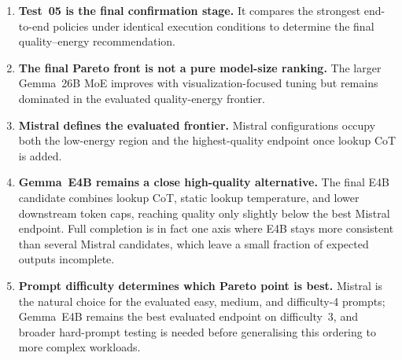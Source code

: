 \begin{enumerate}
    \item \textbf{Test~05 is the final confirmation stage.}
          It compares the strongest end-to-end policies under identical
          execution conditions to determine the final quality--energy
          recommendation.

    \item \textbf{The final Pareto front is not a pure model-size ranking.}
          The larger Gemma~26B MoE improves with visualization-focused tuning
          but remains dominated in the evaluated quality-energy frontier.

    \item \textbf{Mistral defines the evaluated frontier.}
          Mistral configurations occupy both the low-energy region and the
          highest-quality endpoint once lookup CoT is added.

    \item \textbf{Gemma~E4B remains a close high-quality alternative.}
          The final E4B candidate combines lookup CoT, static lookup
          temperature, and lower downstream token caps, reaching quality only
          slightly below the best Mistral endpoint. Full completion is in fact
          one axis where E4B stays more consistent than several Mistral
          candidates, which leave a small fraction of expected outputs
          incomplete.

    \item \textbf{Prompt difficulty determines which Pareto point is best.}
          Mistral is the natural choice for the evaluated easy, medium, and
          difficulty-4 prompts; Gemma~E4B remains the best evaluated endpoint
          on difficulty~3, and broader hard-prompt testing is needed before
          generalising this ordering to more complex workloads.
\end{enumerate}
